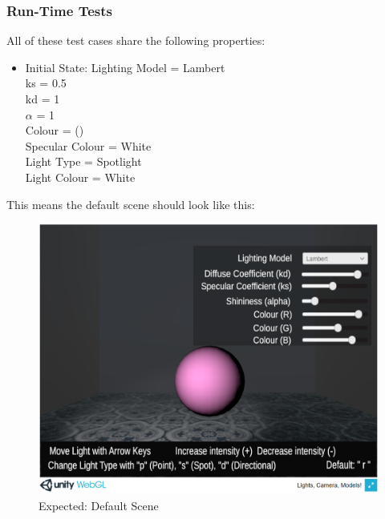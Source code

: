 \documentclass[12pt, titlepage]{article}
\begin{document}
\subsubsection{Run-Time Tests}
All of these test cases share the following properties:
\begin{itemize}
	\item[] Initial State: Lighting Model = Lambert\\
	ks = 0.5 \\ kd = 1 \\ $\alpha$ = 1 \\ Colour = () \\ Specular Colour = 
	White \\ Light Type = Spotlight \\ Light Colour = White \\ 
\end{itemize}

This means the default scene should look like this:

\begin{figure}
	\centering
	\includegraphics[scale=0.25]{./images/fromVnVPlan/sphere-lit-lambert}
	\caption{Expected: Default Scene}
\end{figure}
\end{document}

